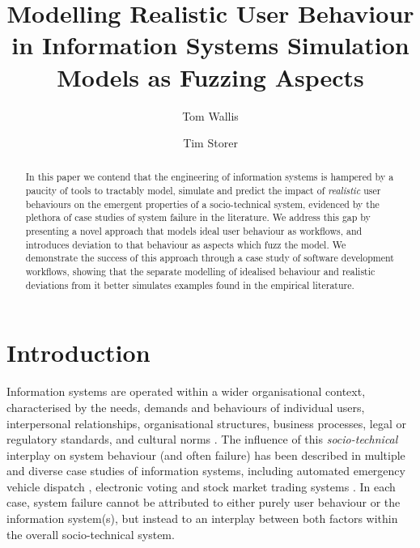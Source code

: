 \documentclass{llncs}
\title{Modelling Realistic User Behaviour in Information Systems Simulation Models as Fuzzing Aspects}
\author{Tom Wallis\orcidID{} \and Tim Storer\orcidID{}}
\institute{University of Glasgow, Glasgow, Scotland,\\
  \email{w.wallis.1@research.gla.ac.uk},\\
  \email{timothy.storer@glasgow.ac.uk},
}
\begin{document}

\maketitle


\begin{abstract}
  In this paper we contend that the engineering of information systems is hampered by a paucity of tools to tractably
  model, simulate and predict the impact of \emph{realistic} user behaviours on the emergent properties of
  a socio-technical system, evidenced by the plethora of case studies of system failure in the literature.  We
  address this gap by presenting a novel approach that models ideal user behaviour as workflows, and introduces
  deviation to that behaviour as aspects which fuzz the model. We demonstrate the success of this approach through a
  case study of software development workflows,  showing that the separate modelling of idealised behaviour and 
  realistic deviations from it better simulates examples found in the empirical literature.
\end{abstract}


\section{Introduction}
\label{sec:introduction}


Information systems are operated within a wider organisational context, characterised by the needs, demands and
behaviours of individual users, interpersonal relationships, organisational structures, business processes, legal or
regulatory standards, and cultural norms \citep{bade07structures,pentland05organisational}.  The
influence of this \emph{socio-technical} interplay on system behaviour (and often failure) has been described in
multiple and diverse case studies of information systems,
including automated emergency vehicle dispatch \citep{robinson96limited}, electronic voting
\citep{lock07observations} and stock market trading systems \citep{cftc-sec10findings}. In each case, system failure
cannot be attributed to either purely user behaviour or the information system(s), but instead to an interplay between
both factors within the overall socio-technical system.
\end{document}
